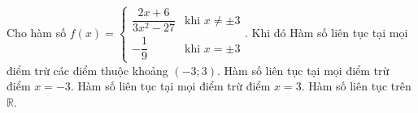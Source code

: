 \begin{ex}
Cho hàm số $f(x)=\begin{cases}\dfrac{2x+6}{3x^2-27}&\text{khi }x\ne\pm3\\-\dfrac19&\text{khi }x=\pm3\end{cases}$. Khi đó
\choiceTF
{Hàm số liên tục tại mọi điểm trừ các điểm thuộc khoảng $(-3;3)$.}
{Hàm số liên tục tại mọi điểm trừ điểm $x=-3$.}
{\True Hàm số liên tục tại mọi điểm trừ điểm $x=3$.}
{Hàm số liên tục trên $\mathbb R$.}
\end{ex}
